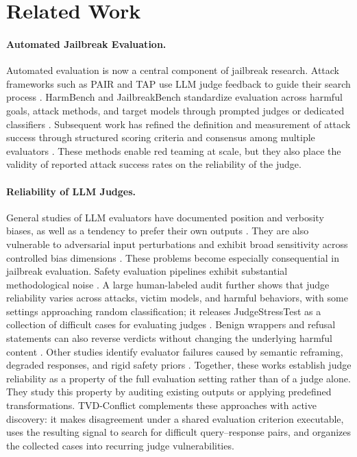\section{Related Work}

\paragraph{Automated Jailbreak Evaluation.}
Automated evaluation is now a central component of jailbreak research. Attack
frameworks such as PAIR and TAP use LLM judge feedback to guide their search
process \citep{chao2023jailbreaking,mehrotra2023tree}. HarmBench and
JailbreakBench standardize evaluation across harmful goals, attack methods, and
target models through prompted judges or dedicated classifiers
\citep{mazeika2024harmbench,chao2024jailbreakbench}. Subsequent work has refined
the definition and measurement of attack success through structured scoring
criteria \citep{souly2024strongreject,cai2024rethinking} and consensus among
multiple evaluators \citep{lin2025efficient}. These methods enable red teaming
at scale, but they also place the validity of reported attack success
rates on the reliability of the judge.

\paragraph{Reliability of LLM Judges.}
General studies of LLM evaluators have documented position and verbosity biases,
as well as a tendency to prefer their own outputs \citep{zheng2023judging}.
They are also vulnerable to adversarial input perturbations
\citep{raina2024is} and exhibit broad sensitivity across controlled bias
dimensions \citep{ICLR2025_fdca08d3}. These problems become especially
consequential in jailbreak evaluation. Safety evaluation pipelines exhibit
substantial methodological noise \citep{beyer2025llm}. A large human-labeled
audit further shows that judge reliability varies across attacks, victim
models, and harmful behaviors, with some settings approaching random
classification; it releases JudgeStressTest as a collection of difficult cases
for evaluating judges \citep{schwinn2026coin}. Benign wrappers and refusal
statements can also reverse verdicts without changing the underlying harmful content
\citep{gao2026reliable}. Other studies identify evaluator failures caused by
semantic reframing, degraded responses, and rigid safety priors
\citep{souly2024strongreject,cai2024rethinking,alloula2026safety,almasoud2026security}.
Together, these works establish judge reliability as a property of the full
evaluation setting rather than of a judge alone. They study this property by
auditing existing outputs or applying predefined transformations.
\textsc{TVD}-Conflict complements these approaches with active discovery: it
makes disagreement under a shared evaluation criterion executable, uses the
resulting signal to search for difficult query--response pairs, and organizes
the collected cases into recurring judge vulnerabilities.
